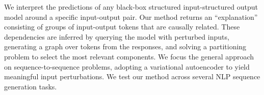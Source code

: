 We interpret the predictions of any black-box structured input-structured output model around a specific input-output pair. Our method returns an ``explanation'' consisting of groups of input-output tokens that are causally related.  These dependencies are inferred by querying the model with perturbed inputs, generating a graph over tokens from the responses, and solving a partitioning problem to select the most relevant components. We focus the general approach on sequence-to-sequence problems, adopting a variational autoencoder to yield meaningful input perturbations. We test our method across several NLP sequence generation tasks.
